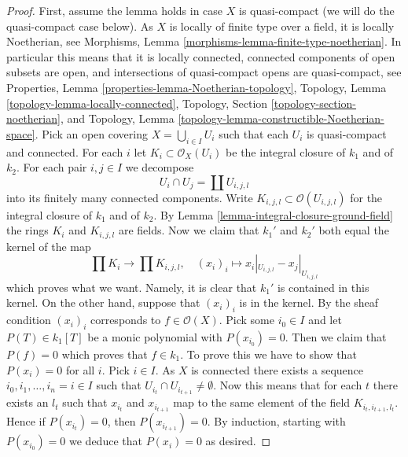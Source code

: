 \begin{proof}
First, assume the lemma holds in case $X$ is quasi-compact (we will
do the quasi-compact case below).
As $X$ is locally of finite type over a field, it is locally Noetherian, see
Morphisms, Lemma \ref{morphisms-lemma-finite-type-noetherian}.
In particular this means that it is locally connected,
connected components of open subsets are open, and
intersections of quasi-compact opens are quasi-compact, see
Properties, Lemma \ref{properties-lemma-Noetherian-topology},
Topology, Lemma \ref{topology-lemma-locally-connected},
Topology, Section \ref{topology-section-noetherian}, and
Topology, Lemma \ref{topology-lemma-constructible-Noetherian-space}.
Pick an open covering $X = \bigcup_{i \in I} U_i$
such that each $U_i$ is quasi-compact and connected.
For each $i$ let $K_i \subset \mathcal{O}_X(U_i)$ be the integral
closure of $k_1$ and of $k_2$.
For each pair $i, j \in I$ we decompose
$$
U_i \cap U_j = \coprod U_{i, j, l}
$$
into its finitely many connected components. Write
$K_{i, j, l} \subset \mathcal{O}(U_{i, j, l})$
for the integral closure of $k_1$ and of $k_2$. By
Lemma \ref{lemma-integral-closure-ground-field}
the rings $K_i$ and $K_{i, j, l}$ are fields.
Now we claim that $k_1'$ and $k_2'$ both equal the kernel of the map
$$
\prod K_i \longrightarrow \prod K_{i, j, l}, \quad
(x_i)_i \longmapsto x_i|_{U_{i, j, l}} - x_j|_{U_{i, j, l}}
$$
which proves what we want.
Namely, it is clear that $k_1'$ is contained in this kernel.
On the other hand, suppose that $(x_i)_i$ is in the kernel.
By the sheaf condition $(x_i)_i$ corresponds to $f \in \mathcal{O}(X)$.
Pick some $i_0 \in I$ and let $P(T) \in k_1[T]$ be a monic polynomial
with $P(x_{i_0}) = 0$. Then we claim that $P(f) = 0$ which proves
that $f \in k_1$. To prove this we have to show that $P(x_i) = 0$
for all $i$. Pick $i \in I$. As $X$ is connected there exists a
sequence $i_0, i_1, \ldots, i_n = i \in I$ such that
$U_{i_t} \cap U_{i_{t + 1}} \not = \emptyset$. Now this means that
for each $t$ there exists an $l_t$ such that $x_{i_t}$ and
$x_{i_{t + 1}}$ map to the same element of the field $K_{i_t, i_{t + 1}, l_t}$.
Hence if $P(x_{i_t}) = 0$, then $P(x_{i_{t + 1}}) = 0$. By
induction, starting with $P(x_{i_0}) = 0$ we deduce that
$P(x_i) = 0$ as desired.


\end{proof}
